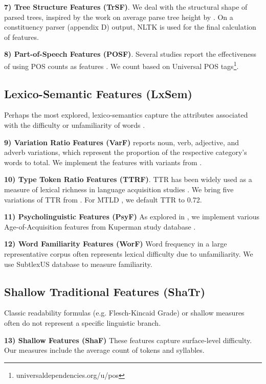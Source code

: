 \documentclass[11pt]{article}
\begin{document}
\textbf{7) Tree Structure Features (TrSF)}. 
We deal with the structural shape of parsed trees, inspired by the work on average parse tree height by \citet{Schwarm}. On a constituency parser (appendix D) output, NLTK \citep{loper2002nltk} is used for the final calculation of features.

\textbf{8) Part-of-Speech Features (POSF)}. 
Several studies report the effectiveness of using POS counts as features \citep{tonelli2012making, Leeb:20}. We count based on Universal POS tags\footnote{universaldependencies.org/u/pos}.

\subsection{Lexico-Semantic Features (LxSem)}
Perhaps the most explored, lexico-semantics capture the attributes associated with the difficulty or unfamiliarity of words \citep{Collins-Thompson:14}. 

\textbf{9) Variation Ratio Features (VarF)} 
\citet{Lu:11} reports noun, verb, adjective, and adverb variations, which represent the proportion of the respective category's words to total. We implement the features with variants from \citet{Vajjala:12}.

\textbf{10) Type Token Ratio Features (TTRF)}. 
TTR has been widely used as a measure of lexical richness in language acquisition studies \citep{Malvern:12}. We bring five variations of TTR from \citet{Vajjala:12}. For MTLD \citep{mccarthy2010mtld}, we default TTR to 0.72.

\textbf{11) Psycholinguistic Features (PsyF)} 
As explored in \citet{vajjala2016readability}, we implement various Age-of-Acquisition features from Kuperman study database \citet{kuperman2012age}.

\textbf{12) Word Familiarity Features (WorF)} 
Word frequency in a large representative corpus often represents lexical difficulty \citep{Collins-Thompson:14} due to unfamiliarity. We use SubtlexUS database \citep{brysbaert2009moving} to measure familiarity.

\subsection{Shallow Traditional Features (ShaTr)}
Classic readability formulas (e.g. Flesch-Kincaid Grade) \citep{Kincaid:75} or shallow measures often do not represent a specific linguistic branch.

\textbf{13) Shallow Features (ShaF)}
These features capture surface-level difficulty. Our measures include the average count of tokens and syllables.
\end{document}
